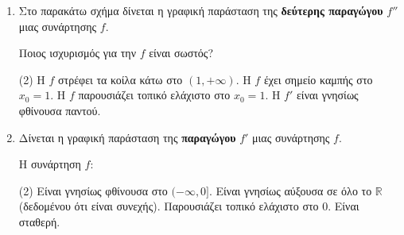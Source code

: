 \begin{enumerate}[label=\textbf{2.\arabic*.}, itemsep=4mm]
    \item Στο παρακάτω σχήμα δίνεται η γραφική παράσταση της \textbf{δεύτερης παραγώγου} $f''$ μιας συνάρτησης $f$.
    \begin{center}
    \end{center}
    Ποιος ισχυρισμός για την $f$ είναι σωστός?
    \begin{tasks}[label=\let\textdexiakeraia\relax\alph*.](2)
        \task Η $f$ στρέφει τα κοίλα κάτω στο $(1, +\infty)$.
        \task Η $f$ έχει σημείο καμπής στο $x_0 = 1$.
        \task Η $f$ παρουσιάζει τοπικό ελάχιστο στο $x_0 = 1$.
        \task Η $f'$ είναι γνησίως φθίνουσα παντού.
    \end{tasks}

    \item Δίνεται η γραφική παράσταση της \textbf{παραγώγου} $f'$ μιας συνάρτησης $f$.
    \begin{center}
    \end{center}
    Η συνάρτηση $f$:
    \begin{tasks}[label=\let\textdexiakeraia\relax\alph*.](2)
        \task Είναι γνησίως φθίνουσα στο $(-\infty, 0]$.
        \task Είναι γνησίως αύξουσα σε όλο το $\mathbb{R}$ (δεδομένου ότι είναι συνεχής).
        \task Παρουσιάζει τοπικό ελάχιστο στο $0$.
        \task Είναι σταθερή.
    \end{tasks}


\end{enumerate}
